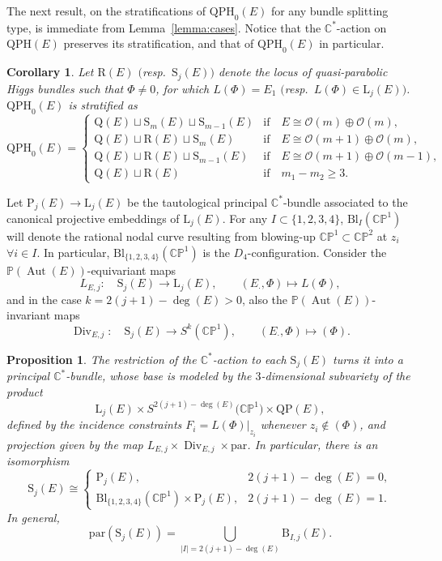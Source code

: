 \documentclass[pdftex]{sigma}
\newcommand{\field}[1]{\ensuremath{\mathbb{#1}}}
\newcommand{\CC}{\field{C}}
\newcommand{\PP}{\field{P}}
\newcommand{\calO}{\mathcal{O}}
\newcommand{\qp}{\boldsymbol{\cdot}}
\DeclareMathOperator{\Aut}{Aut}
\DeclareMathOperator{\Div}{Div}
\numberwithin{equation}{section}
\newtheorem{Corollary}[Theorem]{Corollary}
\newtheorem{Proposition}[Theorem]{Proposition}
 { \theoremstyle{definition}
\newtheorem{Definition}[Theorem]{Definition}
\newtheorem{Note}[Theorem]{Note}
\newtheorem{Example}[Theorem]{Example}
\newtheorem{Remark}[Theorem]{Remark} }
\begin{document}
The next result, on the stratifications of $\mathrm{QPH}_{0}(E)$ for any bundle splitting type, is immediate from Lemma~\ref{lemma:cases}. Notice that the $\CC^{*}$-action on $\mathrm{QPH}(E)$ preserves its stratification, and that of $\mathrm{QPH}_{0}(E)$ in particular.

\begin{Corollary}\label{cor:strata}
Let $\mathrm{R}(E)$ $($resp.~$\mathrm{S}_{j}(E))$ denote the locus of quasi-parabolic Higgs bundles such that $\Phi\neq 0$, for which $L(\Phi)=E_{1}$ $($resp.~$L(\Phi)\in \mathrm{L}_{j}(E))$. $\mathrm{QPH}_{0}(E)$ is stratified as
\[
\mathrm{QPH}_{0}(E) =
\begin{cases}
\mathrm{Q}(E) \sqcup \mathrm{S}_{m}(E)\sqcup \mathrm{S}_{m-1}(E) & \text{if} \quad E\cong\calO(m)\oplus\calO(m),
\\
\mathrm{Q}(E) \sqcup \mathrm{R}(E) \sqcup \mathrm{S}_{m}(E) & \text{if} \quad E\cong\calO(m+1)\oplus\calO(m),
\\
\mathrm{Q}(E) \sqcup \mathrm{R}(E) \sqcup \mathrm{S}_{m-1}(E) & \text{if} \quad E\cong\calO(m+1)\oplus\calO(m-1),
\\
\mathrm{Q}(E)\sqcup \mathrm{R}(E) & \text{if} \quad m_{1}-m_{2}\geq 3.
\end{cases}
\]
\end{Corollary}

Let $\mathrm{P}_{j}(E)\rightarrow \mathrm{L}_{j}(E)$ be the tautological principal $\CC^{*}$-bundle associated to the canonical projective embeddings of $\mathrm{L}_{j}(E)$. For any $I\subset\{1,2,3,4\}$, $\mathrm{Bl}_{I}(\CC\PP^{1})$ will denote the rational nodal curve resulting from blowing-up $\CC\PP^{1}\subset \CC\PP^{2}$ at $z_{i}$ $\forall i\in I$. In particular, $\mathrm{Bl}_{\{1,2,3,4\}}(\CC\PP^{1})$ is the $D_{4}$-configuration. Consider the $\PP(\Aut(E))$-equivariant maps
\[
L_{E,j}\colon\quad \mathrm{S}_{j}(E)\rightarrow \mathrm{L}_{j}(E),\qquad (E_{\qp},\Phi)\mapsto L(\Phi),
\]
and in the case $k= 2(j+1) -\deg(E) > 0$, also the $\PP(\Aut (E))$-invariant maps
\[
\Div_{E,j}\colon\quad \mathrm{S}_{j}(E)\rightarrow S^{k}(\CC\PP^{1}),\qquad (E_{\qp},\Phi)\mapsto (\Phi).
\]

\begin{Proposition}\label{prop:S_{j}(E)}
The restriction of the $\CC^{*}$-action to each $\mathrm{S}_{j}(E)$ turns it into a principal $\CC^{*}$-bundle, whose base is modeled by the $3$-dimensional subvariety of the product
\[
\mathrm{L}_{j}(E) \times S^{2(j+1) -\deg(E)}\big(\CC\PP^{1}\big)\times \mathrm{QP}(E),
\]
defined by the incidence constraints $F_{i} = L(\Phi)\vert_{z_{i}}$ whenever $z_{i}\not\in(\Phi)$, and projection given by the map $L_{E,j} \times \Div_{E,j} \times \mathrm{par}$.
 In particular, there is an isomorphism
\[
\mathrm{S}_{j}(E) \cong
\begin{cases}
\mathrm{P}_{j}(E), & 2(j+1) -\deg(E) = 0,\\
\mathrm{Bl}_{\{1,2,3,4\}}(\CC\PP^{1})\times \mathrm{P}_{j}(E), & 2(j+1) -\deg(E) = 1.
\end{cases}
\]
In general,
\[
\mathrm{par}(\mathrm{S}_{j}(E)) = \bigcup_{\vert I\vert = 2(j+1) -\deg(E)}\mathrm{B}_{I,j}(E).
\]
\end{Proposition}
\end{document}
